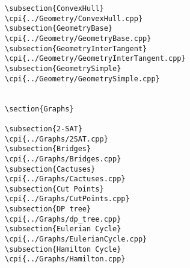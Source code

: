 {\begin{verbatim}
\subsection{ConvexHull}
\cpi{../Geometry/ConvexHull.cpp}
\subsection{GeometryBase}
\cpi{../Geometry/GeometryBase.cpp}
\subsection{GeometryInterTangent}
\cpi{../Geometry/GeometryInterTangent.cpp}
\subsection{GeometrySimple}
\cpi{../Geometry/GeometrySimple.cpp}


\section{Graphs}

\subsection{2-SAT}
\cpi{../Graphs/2SAT.cpp}
\subsection{Bridges}
\cpi{../Graphs/Bridges.cpp}
\subsection{Cactuses}
\cpi{../Graphs/Cactuses.cpp}
\subsection{Cut Points}
\cpi{../Graphs/CutPoints.cpp}
\subsection{DP tree}
\cpi{../Graphs/dp_tree.cpp}
\subsection{Eulerian Cycle}
\cpi{../Graphs/EulerianCycle.cpp}
\subsection{Hamilton Cycle}
\cpi{../Graphs/Hamilton.cpp}

\end{verbatim}}
